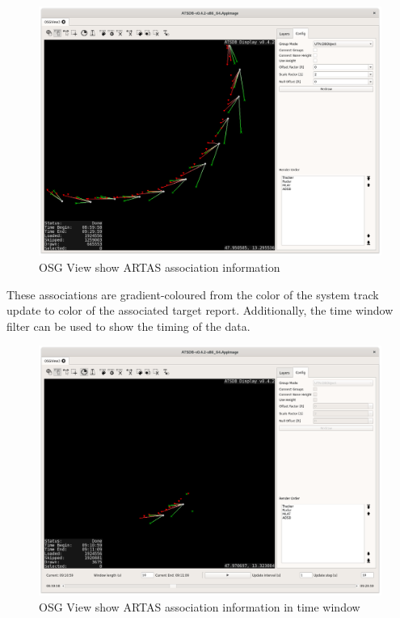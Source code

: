 \begin{figure}[H]
    \hspace*{-2cm}
    \includegraphics[width=18cm]{../screenshots/osgview_assoc.png}
  \caption{OSG View show ARTAS association information}
\end{figure}

These associations are gradient-coloured from the color of the system track update to color of the associated target report. Additionally, the time window filter can be used to show the timing of the data.

\begin{figure}[H]
    \hspace*{-2cm}
    \includegraphics[width=18cm]{../screenshots/osgview_assoc_time_window.png}
  \caption{OSG View show ARTAS association information in time window}
\end{figure}


